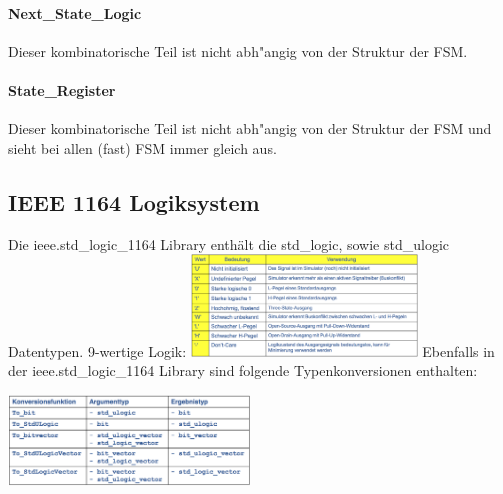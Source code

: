 \begin{multicols}{2}
	\paragraph{Next\_State\_Logic} 
	Dieser kombinatorische Teil ist nicht abh"angig von der Struktur der FSM.
	
	\vfill\null
	\columnbreak
	\paragraph{State\_Register}  
	Dieser kombinatorische Teil ist nicht abh"angig von der Struktur der 
	FSM und sieht bei allen (fast) FSM immer gleich aus.
	
\end{multicols}

\begin{multicols}{2}

	\subsection{IEEE 1164 Logiksystem}
	Die ieee.std\_logic\_1164 Library enthält die std\_logic, sowie std\_ulogic Datentypen. 9-wertige Logik:
	\includegraphics[width=0.45\textwidth]{pics/ieee1164logicsystem}
	\vfill\null
	\columnbreak
	Ebenfalls in der ieee.std\_logic\_1164 Library sind folgende Typenkonversionen enthalten:
	\begin{center}
		\includegraphics[width=0.48\textwidth]{pics/typeconversion}
	\end{center}
\end{multicols}
		
